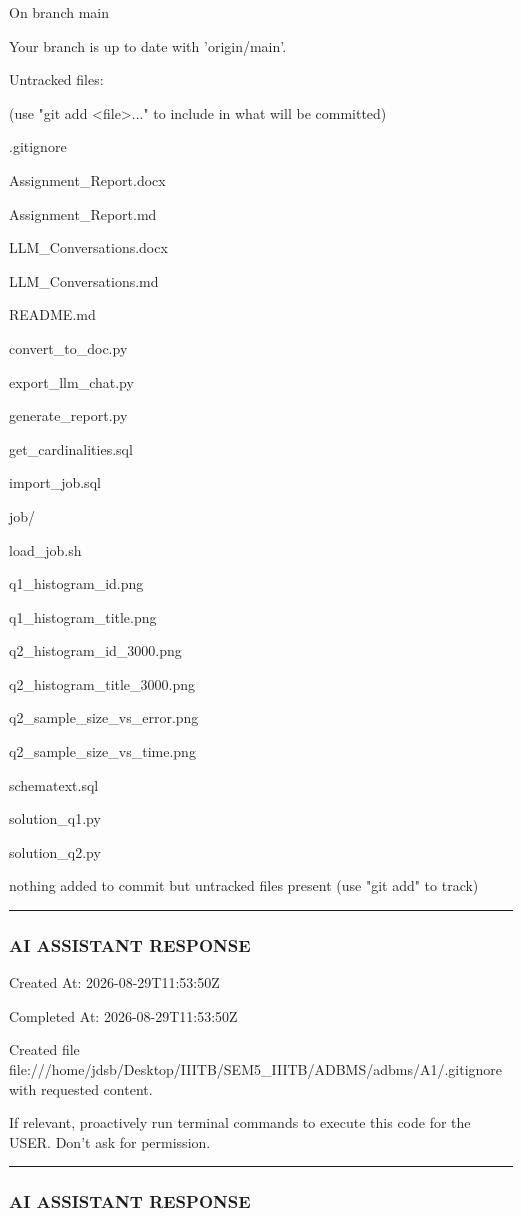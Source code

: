\documentclass[11pt,a4paper]{article}
\begin{document}
{On branch main

Your branch is up to date with 'origin/main'.


Untracked files:

(use "git add <file>..." to include in what will be committed)

.gitignore

Assignment\_Report.docx

Assignment\_Report.md

LLM\_Conversations.docx

LLM\_Conversations.md

README.md

convert\_to\_doc.py

export\_llm\_chat.py

generate\_report.py

get\_cardinalities.sql

import\_job.sql

job/

load\_job.sh

q1\_histogram\_id.png

q1\_histogram\_title.png

q2\_histogram\_id\_3000.png

q2\_histogram\_title\_3000.png

q2\_sample\_size\_vs\_error.png

q2\_sample\_size\_vs\_time.png

schematext.sql

solution\_q1.py

solution\_q2.py


nothing added to commit but untracked files present (use "git add" to track)


\hrule

\subsubsection{AI ASSISTANT RESPONSE}

Created At: 2026-08-29T11:53:50Z

Completed At: 2026-08-29T11:53:50Z

Created file file:///home/jdsb/Desktop/IIITB/SEM5\_IIITB/ADBMS/adbms/A1/.gitignore with requested content.

If relevant, proactively run terminal commands to execute this code for the USER. Don't ask for permission.


\hrule

\subsubsection{AI ASSISTANT RESPONSE}

}
\end{document}

